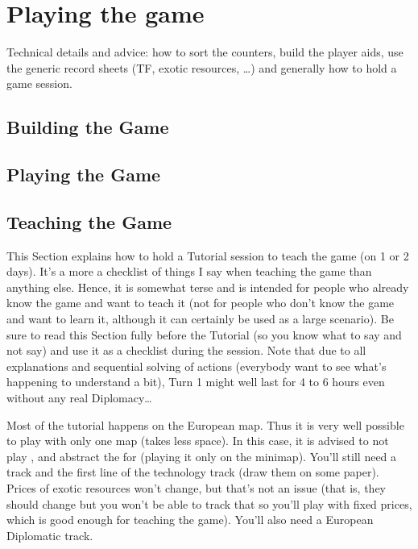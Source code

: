 
\chapter{Playing the game}\label{chapter:Playing}

\begin{todo}
  Technical details and advice: how to sort the counters, build the player
  aids, use the generic record sheets (TF, exotic resources, \ldots) and
  generally how to hold a game session.
\end{todo}

\section{Building the Game}

\section{Playing the Game}

\section{Teaching the Game}
This Section explains how to hold a Tutorial session to teach the game (on 1
or 2 days). It's a more a checklist of things I say when teaching the game
than anything else. Hence, it is somewhat terse and is intended for people who
already know the game and want to teach it (not for people who don't know the
game and want to learn it, although it can certainly be used as a large
scenario). Be sure to read this Section fully before the Tutorial (so you know
what to say and not say) and use it as a checklist during the session. Note
that due to all explanations and sequential solving of actions (everybody want
to see what's happening to understand a bit), Turn 1 might well last for 4 to
6 hours even without any real Diplomacy\ldots

Most of the tutorial happens on the European map. Thus it is very well
possible to play with only one map (takes less space). In this case, it is
advised to not play \POR, and abstract the \ROTW for \HIS (playing it only on
the minimap). You'll still need a \STAB track and the first line of the
technology track (draw them on some paper). Prices of exotic resources won't
change, but that's not an issue (that is, they should change but you won't be
able to track that so you'll play with fixed prices, which is good enough for
teaching the game). You'll also need a European Diplomatic track.

